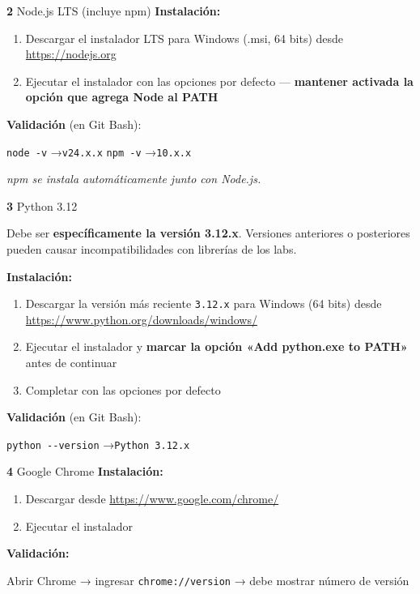 \documentclass[11pt, a4paper]{article}
\newcommand{\version}[1]{\texttt{\textcolor{ibmblue}{#1}}}
\newcommand{\cmd}[1]{\texttt{\textcolor{ibmdark}{\small #1}}}
\newcommand{\checkmark}{\textcolor{ibmgreen}{\faCheckCircle}}
\begin{document}
\vspace{6pt}
\begin{labbox}[ibmdark]{\textbf{2} \quad Node.js LTS (incluye npm)}
\textbf{Instalación:}
\begin{enumerate}[leftmargin=*, nosep]
  \item Descargar el instalador LTS para Windows (.msi, 64 bits) desde \url{https://nodejs.org}
  \item Ejecutar el instalador con las opciones por defecto — \textbf{mantener activada la opción que agrega Node al PATH}
\end{enumerate}
\vspace{4pt}
\textbf{Validación} (en Git Bash):
\begin{center}
  \cmd{node -v} \quad→\quad \version{v24.x.x} \checkmark \qquad
  \cmd{npm -v} \quad→\quad \version{10.x.x} \checkmark
\end{center}
\textit{npm se instala automáticamente junto con Node.js.}
\end{labbox}

\vspace{6pt}
\begin{labbox}[ibmdark]{\textbf{3} \quad Python 3.12}
\begin{criticalbox}
  Debe ser \textbf{específicamente la versión 3.12.x}. Versiones anteriores o posteriores pueden causar incompatibilidades con librerías de los labs.
\end{criticalbox}
\vspace{6pt}
\textbf{Instalación:}
\begin{enumerate}[leftmargin=*, nosep]
  \item Descargar la versión más reciente \version{3.12.x} para Windows (64 bits) desde \url{https://www.python.org/downloads/windows/}
  \item Ejecutar el instalador y \textbf{marcar la opción «Add python.exe to PATH»} antes de continuar
  \item Completar con las opciones por defecto
\end{enumerate}
\vspace{4pt}
\textbf{Validación} (en Git Bash):
\begin{center}
  \cmd{python -{}-version} \quad→\quad \version{Python 3.12.x} \checkmark
\end{center}
\end{labbox}

\vspace{6pt}
\begin{labbox}[ibmdark]{\textbf{4} \quad Google Chrome}
\textbf{Instalación:}
\begin{enumerate}[leftmargin=*, nosep]
  \item Descargar desde \url{https://www.google.com/chrome/}
  \item Ejecutar el instalador
\end{enumerate}
\vspace{4pt}
\textbf{Validación:}
\begin{center}
  Abrir Chrome → ingresar \cmd{chrome://version} → debe mostrar número de versión \checkmark
\end{center}
\end{labbox}
\end{document}
